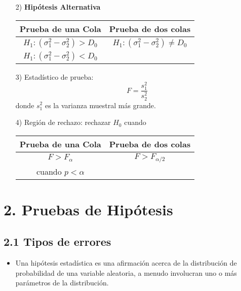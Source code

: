 \begin{frame}
\begin{frame}
\begin{itemize}
donde $D_{0}$ es el valor, la diferencia, espec\'ifico que se desea probar. En algunos casos se querr\'a demostrar que no hay diferencia alguna, es decir $D_{0}=0$.

\item[2) ] \textbf{Hip\'otesis Alternativa}
\begin{tabular}{cc}\hline
\textbf{Prueba de una Cola} & \textbf{Prueba de dos colas}\\\hline
$H_{1}:\left(\sigma^{2}_{1}-\sigma^{2}_{2}\right)>D_{0}$ & $H_{1}:\left(\sigma^{2}_{1}-\sigma^{2}_{2}\right)\neq D_{0}$\\ 
$H_{1}:\left(\sigma^{2}_{1}-\sigma^{2}_{2}\right)<D_{0}$&\\
\end{tabular}

\end{itemize}







\begin{itemize}
\item[3) ] Estad\'istico de prueba:
$$F=\frac{s_{1}^{2}}{s_{2}^{2}}$$
donde $s_{1}^{2}$ es la varianza muestral m\'as grande.
\item[4) ] Regi\'on de rechazo: rechazar $H_{0}$ cuando
\begin{tabular}{cc}\hline
\textbf{Prueba de una Cola} & \textbf{Prueba de dos colas}\\\hline
$F>F_{\alpha}$ & $F>F_{\alpha/2}$\\
 cuando $p<\alpha$&\\
\end{tabular}


\end{itemize}




\section{2. Pruebas de Hip\'otesis}
\subsection{2.1 Tipos de errores}





\begin{itemize}
\item Una hip\'otesis estad\'istica es una afirmaci\'on  acerca de la distribuci\'on de probabilidad de una variable aleatoria, a menudo involucran uno o m\'as par\'ametros de la distribuci\'on.


\end{itemize}
\end{frame}
\end{frame}
